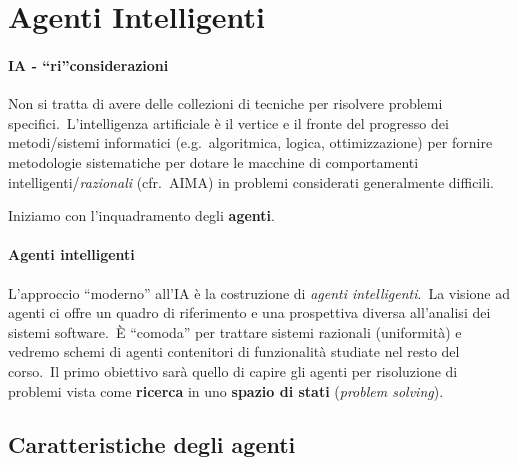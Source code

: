 \chapter{Agenti Intelligenti}

\subsubsection{IA - ``ri''considerazioni}

Non si tratta di avere delle collezioni di tecniche per risolvere problemi specifici.\
L'intelligenza artificiale è il vertice e il fronte del progresso dei metodi/sistemi informatici (e.g.\ algoritmica, logica, ottimizzazione) per fornire metodologie sistematiche per dotare le macchine di comportamenti intelligenti/\textit{razionali} (cfr.\ AIMA) in problemi considerati generalmente difficili.\

Iniziamo con l'inquadramento degli \textbf{agenti}.

\subsubsection{Agenti intelligenti}

L'approccio ``moderno'' all'IA è la costruzione di \textit{agenti intelligenti}.\
La visione ad agenti ci offre un quadro di riferimento e una prospettiva diversa all'analisi dei sistemi software.\
È ``comoda'' per trattare sistemi razionali (uniformità) e vedremo schemi di agenti contenitori di funzionalità studiate nel resto del corso.\
Il primo obiettivo sarà quello di capire gli agenti per risoluzione di problemi vista come \textbf{ricerca} in uno \textbf{spazio di stati} (\textit{problem solving}).

\section{Caratteristiche degli agenti}


